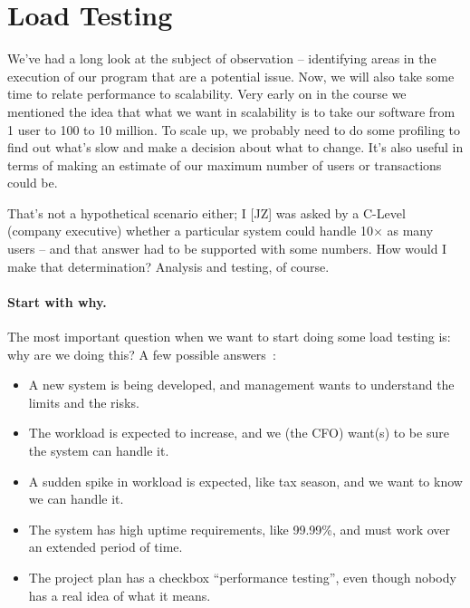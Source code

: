 




\section*{Load Testing}

We've had a long look at the subject of observation -- identifying areas in the execution of our program that are a potential issue. Now, we will also take some time to relate performance to scalability. Very early on in the course we mentioned the idea that what we want in scalability is to take our software from 1 user to 100 to 10 million. To scale up, we probably need to do some profiling to find out what's slow and make a decision about what to change. It's also useful in terms of making an estimate of our maximum number of users or transactions could be. 

That's not a hypothetical scenario either; I [JZ] was asked by a C-Level (company executive) whether a particular system could handle 10$\times$ as many users -- and that answer had to be supported with some numbers. How would I make that determination? Analysis and testing, of course.

\paragraph{Start with why.} The most important question when we want to start doing some load testing is: why are we doing this? A few possible answers~\cite{hitchhiking}:
\begin{itemize}
	\item A new system is being developed, and management wants to understand the limits and the risks.
	\item The workload is expected to increase, and we (the CFO) want(s) to be sure the system can handle it.
	\item A sudden spike in workload is expected, like tax season, and we want to know we can handle it.
	\item The system has high uptime requirements, like 99.99\%, and must work over an extended period of time. 
	\item The project plan has a checkbox ``performance testing'', even though nobody has a real idea of what it means.
\end{itemize}

